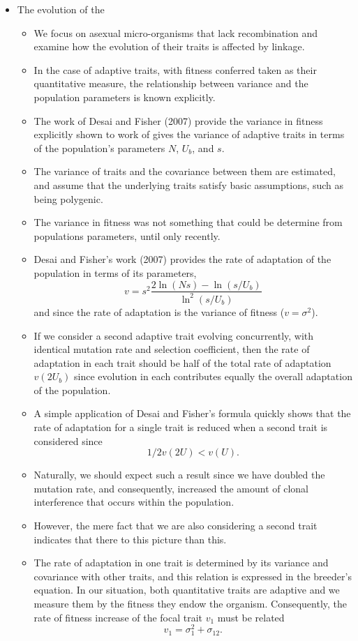 \documentclass[11pt,one column]{article}
\begin{document}
\begin{itemize}
\item The evolution of the 
\begin{itemize}
\item We focus on asexual micro-organisms that lack recombination and examine how the evolution of their traits is affected by linkage.	
\item In the case of adaptive traits, with fitness conferred taken as their quantitative measure, the relationship between variance and the population parameters is known explicitly. 
\item The work of Desai and Fisher (2007) provide the variance in fitness explicitly shown to work of gives the variance of adaptive traits in terms of the population’s parameters $N$, $U_b$, and $s$. 
\item The variance of traits and the covariance between them are estimated, and assume that the underlying traits satisfy basic assumptions, such as being polygenic. 
\item The variance in fitness was not something that could be determine from populations parameters, until only recently. 
\item Desai and Fisher’s work (2007) provides the rate of adaptation of the population in terms of its parameters, \[v =s^2  \frac{2 \ln(Ns)-\ln(s/U_b)}{\ln^2(s/U_b)}\] and since the rate of adaptation is the variance of fitness ($v=\sigma^2$).
\item If we consider a second adaptive trait evolving concurrently, with identical mutation rate and selection coefficient, then the rate of adaptation in each trait should be half of the total rate of adaptation $v(2U_b)$ since evolution in each contributes equally the overall adaptation of the population. 
\item A simple application of Desai and Fisher’s formula quickly shows that the rate of adaptation for a single trait is reduced when a second trait is considered since \[ 1/2  v(2U)<v(U). \]
\item Naturally, we should expect such a result since we have doubled the mutation rate, and consequently, increased the amount of clonal interference that occurs within the population. 
\item However, the mere fact that we are also considering a second trait indicates that there to this picture than this.
\item The rate of adaptation in one trait is determined by its variance and covariance with other traits, and this relation is expressed in the breeder’s equation. In our situation, both quantitative traits are adaptive and we measure them by the fitness they endow the organism. Consequently, the rate of fitness increase of the focal trait $v_1$ must be related \[v_1=\sigma_1^2+\sigma_{12}.\]
\end{itemize}


\end{itemize}
\end{document}
